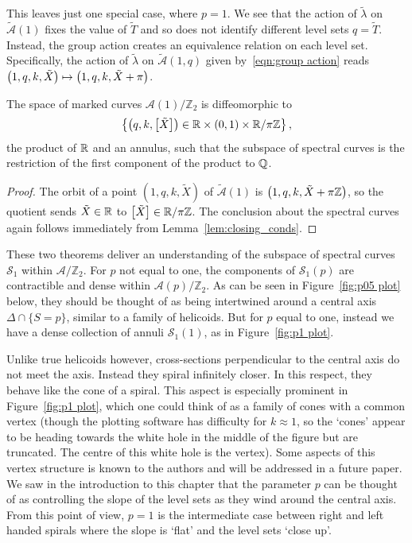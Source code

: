 \documentclass{article}
\begin{document}
This leaves just one special case, where $p=1$. We see that the action of $\tilde{\lambda}$ on $\mathcal{\tilde{A}}(1)$ fixes the value of $\tilde{T}$ and so does not identify different level sets $q=\tilde{T}$. Instead, the group action creates an equivalence relation on each level set. Specifically, the action of $\tilde{\lambda}$ on $\mathcal{\tilde{A}}(1,q)$ given by~\eqref{eqn:group action} reads $\left(1,q,k,\tilde{X}\right) \mapsto \left(1, q, k, \tilde{X} + \pi\right)$.

\begin{thm}\label{thm:topology_curves_p1}
The space of marked curves $\mathcal{A}(1)/\mathbb{Z}_2$ is diffeomorphic to
\[
\left\{ \left(q,k,\left[\tilde{X}\right]\right) \in \mathbb{R} \times (0,1) \times \mathbb{R}/\pi\mathbb{Z} \right\},
\]
the product of $\mathbb{R}$ and an annulus, such that the subspace of spectral curves is the restriction of the first component of the product to $\mathbb{Q}$.

\begin{proof}
The orbit of a point $(1,q,k,\tilde{X})$ of $\mathcal{\tilde{A}}(1)$ is $\left(1,q,k,\tilde{X}+\pi\mathbb{Z}\right)$,
so the quotient sends $\tilde{X} \in \mathbb{R}$ to $\left[\tilde{X}\right] \in \mathbb{R}/\pi\mathbb{Z}$. The conclusion about the spectral curves again follows immediately from Lemma~\ref{lem:closing_conds}.
\end{proof}
\end{thm}

These two theorems deliver an understanding of the subspace of spectral curves $\mathcal{S}_1$ within $\mathcal{A}/\mathbb{Z}_2$. 
For $p$ not equal to one, the components of $\mathcal{S}_1(p)$ are contractible and dense within $\mathcal{A}(p)/\mathbb{Z}_2$. As can be seen in Figure~\ref{fig:p05 plot} below, they should be thought of as being intertwined around a central axis $\Delta\cap\{S=p\}$, similar to a family of helicoids. But for $p$ equal to one, instead we have a dense collection of annuli $\mathcal{S}_1(1)$, as in Figure~\ref{fig:p1 plot}.

Unlike true helicoids however, cross-sections perpendicular to the central axis do not meet the axis. Instead they spiral infinitely closer. In this respect, they behave like the cone of a spiral. This aspect is especially prominent in Figure~\ref{fig:p1 plot}, which one could think of as a family of cones with a common vertex (though the plotting software has difficulty for $k\approx 1$, so the `cones' appear to be heading towards the white hole in the middle of the figure but are truncated. The centre of this white hole is the vertex). Some aspects of this vertex structure is known to the authors and will be addressed in a future paper.
We saw in the introduction to this chapter that the parameter $p$ can be thought of as controlling the slope of the level sets as they wind around the central axis. From this point of view, $p=1$ is the intermediate case between right and left handed spirals where the slope is `flat' and the level sets `close up'.
\end{document}
